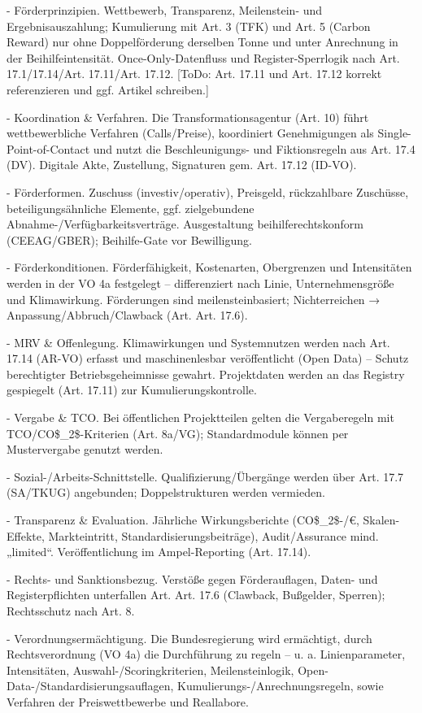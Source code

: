 \documentclass[12pt,a4paper]{scrartcl}
\begin{document}
- Förderprinzipien. Wettbewerb, Transparenz, Meilenstein- und Ergebnisauszahlung; Kumulierung mit Art. 3 (TFK) und Art. 5 (Carbon Reward) nur ohne Doppelförderung derselben Tonne und unter Anrechnung in der Beihilfeintensität. Once-Only-Datenfluss und Register-Sperrlogik nach Art. 17.1/17.14/Art. 17.11/Art. 17.12. [ToDo: Art. 17.11 und Art. 17.12 korrekt referenzieren und ggf. Artikel schreiben.]

- Koordination \& Verfahren. Die Transformationsagentur (Art. 10) führt wettbewerbliche Verfahren (Calls/Preise), koordiniert Genehmigungen als Single-Point-of-Contact und nutzt die Beschleunigungs- und Fiktionsregeln aus Art. 17.4 (DV). Digitale Akte, Zustellung, Signaturen gem. Art. 17.12 (ID-VO).

- Förderformen. Zuschuss (investiv/operativ), Preisgeld, rückzahlbare Zuschüsse, beteiligungsähnliche Elemente, ggf. zielgebundene Abnahme-/Verfügbarkeitsverträge. Ausgestaltung beihilferechtskonform (CEEAG/GBER); Beihilfe-Gate vor Bewilligung.

- Förderkonditionen. Förderfähigkeit, Kostenarten, Obergrenzen und Intensitäten werden in der VO 4a festgelegt -- differenziert nach Linie, Unternehmensgröße und Klimawirkung. Förderungen sind meilensteinbasiert; Nichterreichen → Anpassung/Abbruch/Clawback (Art. Art. 17.6).

- MRV \& Offenlegung. Klimawirkungen und Systemnutzen werden nach Art. 17.14 (AR-VO) erfasst und maschinenlesbar veröffentlicht (Open Data) -- Schutz berechtigter Betriebsgeheimnisse gewahrt. Projektdaten werden an das Registry gespiegelt (Art. 17.11) zur Kumulierungskontrolle.

- Vergabe \& TCO. Bei öffentlichen Projektteilen gelten die Vergaberegeln mit TCO/CO\$\_2\$-Kriterien (Art. 8a/VG); Standardmodule können per Mustervergabe genutzt werden.

- Sozial-/Arbeits-Schnittstelle. Qualifizierung/Übergänge werden über Art. 17.7 (SA/TKUG) angebunden; Doppelstrukturen werden vermieden.

- Transparenz \& Evaluation. Jährliche Wirkungsberichte (CO\$\_2\$-/€, Skalen-Effekte, Markteintritt, Standardisierungsbeiträge), Audit/Assurance mind. „limited“. Veröffentlichung im Ampel-Reporting (Art. 17.14).

- Rechts- und Sanktionsbezug. Verstöße gegen Förderauflagen, Daten- und Registerpflichten unterfallen Art. Art. 17.6 (Clawback, Bußgelder, Sperren); Rechtsschutz nach Art. 8.

- Verordnungsermächtigung. Die Bundesregierung wird ermächtigt, durch Rechtsverordnung (VO 4a) die Durchführung zu regeln -- u. a. Linienparameter, Intensitäten, Auswahl-/Scoringkriterien, Meilensteinlogik, Open-Data-/Standardisierungsauflagen, Kumulierungs-/Anrechnungsregeln, sowie Verfahren der Preiswettbewerbe und Reallabore.
\end{document}
